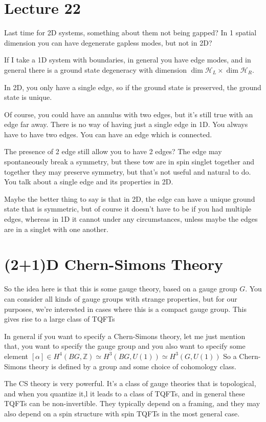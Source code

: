 \section{Lecture 22}
\begin{question}
    Last time for 2D systems,
    something about them not being gapped?
    In 1 spatial dimension you can have degenerate gapless modes,
    but not in 2D?
\end{question}
If I take a 1D system with boundaries,
in general you have edge modes,
and in general there is a ground state degeneracy
with dimension $\dim \mathcal{H}_L \times \dim \mathcal{H}_R$.

In 2D,
you only have a single edge,
so if the ground state is preserved,
the ground state is unique.

Of course,
you could have an annulus with two edges,
but it's still true with an edge far away.
There is no way of having just a single edge in 1D.
You always have to have two edges.
You can have an edge which is connected.

The presence of 2 edge still allow you to have 2 edges?
The edge may spontaneously break a symmetry,
but these tow are in spin singlet together and together they may preserve
symmetry,
but that's not useful and natural to do.
You talk about a single edge and its properties in 2D.

Maybe the better thing to say is that in 2D,
the edge can have a unique ground state that is symmetric,
but of course it doesn't have to be if you had multiple edges,
whereas in 1D it cannot under any circumstances,
unless maybe the edges are in a singlet with one another.


\section{(2+1)D Chern-Simons Theory}
So the idea here is that this is some gauge theory,
based on a gauge group $G$.
You can consider all kinds of gauge groups with strange properties,
but for our purposes,
we're interested in cases where this is a compact gauge group.
This gives rise to a large class of TQFTs

In general if you want to specify a Chern-Simons theory,
let me just mention that,
you want to specify the gauge group and you also want to specify some element
$[\alpha] \in H^4(BG,\mathbb{Z})\simeq H^3(BG, U(1))\simeq H^3(G, U(1))$
So a Chern-Simons theory is defined by a group and some choice of cohomology
class.

The CS theory is very powerful.
It's a class of gauge theories that is topological,
and when you quantize it,l
it leads to a class of TQFTs,
and in general these TQFTs can be non-invertible.
They typically depend on a framing,
and they may also depend on a spin structure
with spin TQFTs in the most general case.

